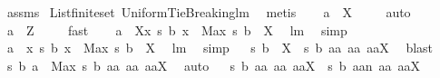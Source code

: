 \begin{isabellebody}
\ assms{\isacharparenleft}{}{\isacharparenright}\ \isanewline
List{\isachardot}finite{\isacharunderscore}set\ UniformTieBreaking{\isachardot}lm{}{}\ \isamarkupfalse%
\ metis\ \isamarkupfalse%
\ \isanewline
{}{\isacharcolon}\ {\isachardoublequoteopen}a\ {\isasymin}\ {\isacharquery}X{\isachardoublequoteclose}\ \isamarkupfalse%
\ {}\ \isamarkupfalse%
\ auto\ \isamarkupfalse%
\ {\isachardoublequoteopen}a\ {\isasymin}\ {\isacharquery}Z{\isachardoublequoteclose}\ \isamarkupfalse%
\ {}\ \isamarkupfalse%
\ fast\ \isanewline
{}\isamarkupfalse%
\ \isamarkupfalse%
\ {\isachardoublequoteopen}a\ {\isasymin}\ {\isacharquery}X{\isasyminter}{\isacharbraceleft}x{\isachardot}\ {\isacharquery}s\ b\ x\ {\isacharequal}\ Max\ {\isacharparenleft}{\isacharquery}s\ b\ {\isacharbackquote}\ {\isacharquery}X{\isacharparenright}{\isacharbraceright}{\isachardoublequoteclose}\ \isamarkupfalse%
\ lm{}{}\ \isamarkupfalse%
\ simp\isanewline
{}\isamarkupfalse%
\ \isamarkupfalse%
\ {\isachardoublequoteopen}a\ {\isasymin}\ {\isacharbraceleft}x{\isachardot}\ {\isacharquery}s\ b\ x\ {\isacharequal}\ Max\ {\isacharparenleft}{\isacharquery}s\ b\ {\isacharbackquote}\ {\isacharquery}X{\isacharparenright}{\isacharbraceright}{\isachardoublequoteclose}\ \isamarkupfalse%
\ lm{}{}\ \isamarkupfalse%
\ simp\isanewline
{}\isamarkupfalse%
\ \isamarkupfalse%
\ {\isachardoublequoteopen}{\isacharquery}s\ b\ {\isacharbackquote}\ {\isacharquery}X\ {\isacharequal}\ {\isacharbraceleft}{\isacharquery}s\ b\ aa{\isacharbar}\ aa{\isachardot}\ aa{\isasymin}{\isacharquery}X{\isacharbraceright}{\isachardoublequoteclose}\ \isamarkupfalse%
\ blast\isanewline
{}\isamarkupfalse%
\ \isamarkupfalse%
\ {\isachardoublequoteopen}{\isacharquery}s\ b\ a\ {\isacharequal}\ Max\ {\isacharbraceleft}{\isacharquery}s\ b\ aa{\isacharbar}\ aa{\isachardot}\ aa{\isasymin}{\isacharquery}X{\isacharbraceright}{\isachardoublequoteclose}\ \isamarkupfalse%
\ auto\isanewline
{}\isamarkupfalse%
\ \isamarkupfalse%
\ {\isachardoublequoteopen}{\isacharbraceleft}{\isacharquery}s\ b\ aa{\isacharbar}\ aa{\isachardot}\ aa{\isasymin}{\isacharquery}X{\isacharbraceright}\ {\isacharequal}\ {\isacharbraceleft}{\isacharquery}s\ b\ {\isacharparenleft}aa{\isacharminus}{\isacharminus}{\isacharquery}n{\isacharparenright}{\isacharbar}\ aa{\isachardot}\ aa{\isasymin}{\isacharquery}X{\isacharbraceright}{\isachardoublequoteclose}\ \isamarkupfalse%

\end{isabellebody}
